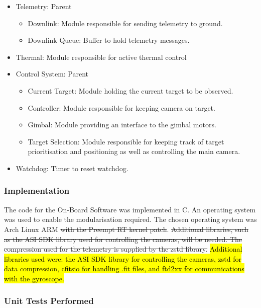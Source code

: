 \begin{itemize}
    \item Telemetry: Parent
        \begin{itemize}
            \item Downlink: Module responsible for sending telemetry to ground.
            \item Downlink Queue: Buffer to hold telemetry messages.
        \end{itemize}

    \item Thermal: Module responsible for active thermal control

    \item Control System: Parent
        \begin{itemize}
            \item Current Target: Module holding the current target to be observed.
            \item Controller: Module responsible for keeping camera on target.
            \item Gimbal: Module providing an interface to the gimbal motors.
            \item Target Selection: Module responsible for keeping track of target prioritisation and positioning as well as controlling the main camera.
        \end{itemize}

    \item Watchdog: Timer to reset watchdog.

\end{itemize}

\subsubsection{Implementation}

The code for the On-Board Software was implemented in C. An operating system was used to enable the modularisation required. The chosen operating system was Arch Linux ARM \st{with the Preempt RT kernel patch}. \st{Additional libraries, such as the ASI SDK library used for controlling the cameras, will be needed. The compression used for the telemetry is supplied by the zstd library.} \hl{Additional libraries used were: the ASI SDK library for controlling the cameras, zstd for data compression, cfitsio for handling .fit files, and ftd2xx for communications with the gyroscope.}

\subsubsection{Unit Tests Performed}

